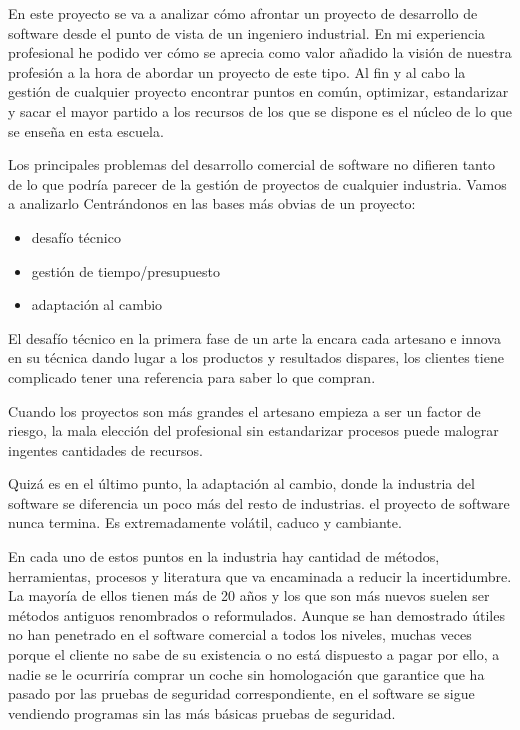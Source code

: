  
 En este proyecto se va a analizar cómo afrontar un proyecto de desarrollo de software desde el punto de vista de un ingeniero industrial. En mi experiencia profesional he podido ver cómo se aprecia como valor añadido la visión de nuestra profesión a la hora de abordar un proyecto de este tipo. Al fin y al cabo la gestión de cualquier proyecto encontrar puntos en común, optimizar, estandarizar y sacar el mayor partido a los recursos de los que se dispone es el núcleo de lo que se enseña en esta escuela.
 
 
Los principales problemas del desarrollo comercial de software no difieren tanto de lo que podría parecer de la gestión de proyectos de cualquier industria. Vamos a analizarlo Centrándonos en las bases más obvias de un proyecto: 

\begin{itemize}
 	\item desafío técnico
	\item gestión de tiempo/presupuesto
	\item adaptación al cambio
\end{itemize} 


El desafío técnico en la primera fase de un arte la encara cada artesano e innova en su técnica dando lugar a los productos y resultados dispares, los clientes tiene complicado tener una referencia para saber lo que compran.

Cuando los proyectos son más grandes el artesano empieza a ser un factor de riesgo, la mala elección del profesional sin estandarizar procesos puede malograr ingentes cantidades de recursos.

Quizá es en el último punto, la adaptación al cambio, donde la industria del software se diferencia un poco más del resto de industrias. el proyecto de software nunca termina. Es extremadamente volátil, caduco y cambiante.

En cada uno de estos puntos en la industria hay cantidad de métodos, herramientas, procesos y literatura que va encaminada a reducir la incertidumbre. La mayoría de ellos tienen más de 20 años y los que son más nuevos suelen ser métodos antiguos renombrados o reformulados. Aunque se han demostrado útiles no han penetrado en el software comercial a todos los niveles, muchas veces porque el cliente no sabe de su existencia o no está dispuesto a pagar por ello, a nadie se le ocurriría comprar un coche sin homologación que garantice que ha pasado por las pruebas de seguridad correspondiente, en el software se sigue vendiendo programas sin las más básicas pruebas de seguridad.

